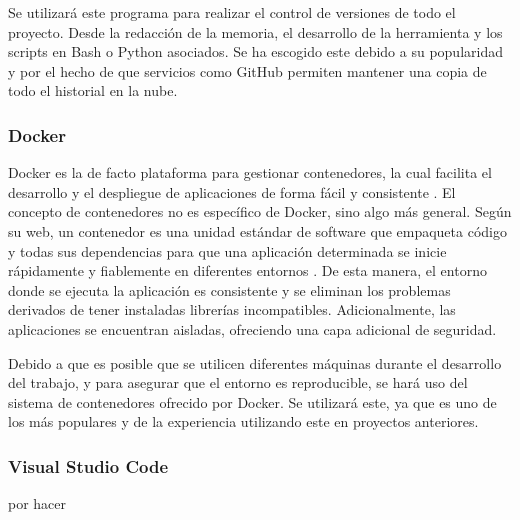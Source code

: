 Se utilizará este programa para realizar el control de versiones de todo el proyecto. Desde la redacción de la memoria, el desarrollo de la herramienta y los scripts en Bash o Python asociados. Se ha escogido este debido a su popularidad y por el hecho de que servicios como GitHub permiten mantener una copia de todo el historial en la nube.

\subsubsection{Docker}

Docker es la de facto plataforma para gestionar contenedores, la cual facilita el desarrollo y el despliegue de aplicaciones de forma fácil y consistente \cite{dockerruntime}. El concepto de contenedores no es específico de Docker, sino algo más general. Según su web, un contenedor es una unidad estándar de software que empaqueta código y todas sus dependencias para que una aplicación determinada se inicie rápidamente y fiablemente en diferentes entornos \cite{dockerwhatsacontainer}. De esta manera, el entorno donde se ejecuta la aplicación es consistente y se eliminan los problemas derivados de tener instaladas librerías incompatibles. Adicionalmente, las aplicaciones se encuentran aisladas, ofreciendo una capa adicional de seguridad.

Debido a que es posible que se utilicen diferentes máquinas durante el desarrollo del trabajo, y para asegurar que el entorno es reproducible, se hará uso del sistema de contenedores ofrecido por Docker. Se utilizará este, ya que es uno de los más populares y de la experiencia utilizando este en proyectos anteriores.

\subsubsection{Visual Studio Code}

por hacer
